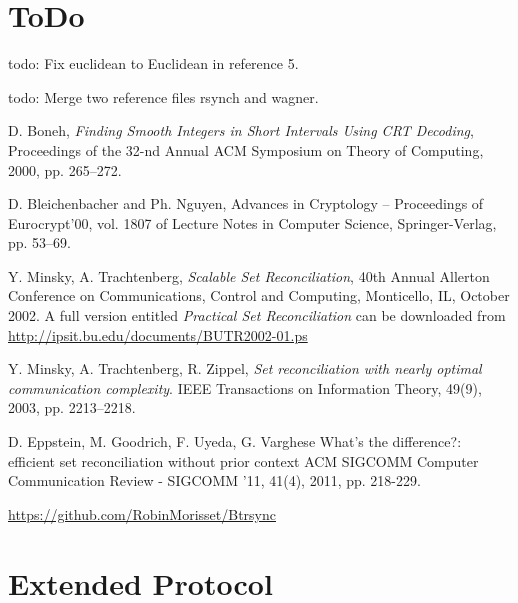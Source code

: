 \documentclass[11pt]{llncs}
\begin{document}
\section{ToDo}

todo: Fix euclidean to Euclidean in reference 5.\smallskip

todo: Merge two reference files rsynch and wagner.\smallskip

\nocite{rsync}
\nocite{wagner}




\begin{thebibliography}{30}

 D. Boneh, {\sl Finding Smooth Integers in Short Intervals Using CRT Decoding}, Proceedings of the 32-nd Annual ACM Symposium on Theory of Computing, 2000, pp. 265--272.

 D. Bleichenbacher and Ph. Nguyen, Advances in Cryptology -- Proceedings of Eurocrypt'00, vol. 1807 of Lecture Notes in Computer Science, Springer-Verlag, pp. 53--69.

 Y. Minsky, A. Trachtenberg, {\sl Scalable Set Reconciliation}, 40th Annual Allerton Conference on Communications, Control and Computing, Monticello, IL, October 2002. A full version entitled {\sl Practical Set Reconciliation} can be downloaded from \url{http://ipsit.bu.edu/documents/BUTR2002-01.ps}

 Y. Minsky, A. Trachtenberg, R. Zippel, {\sl Set reconciliation with nearly optimal communication complexity}. IEEE Transactions on Information Theory, 49(9), 2003, pp. 2213–2218.

 D. Eppstein, M. Goodrich, F. Uyeda, G. Varghese What's the difference?: efficient set reconciliation without prior context
ACM SIGCOMM Computer Communication Review - SIGCOMM '11, 41(4), 2011, pp. 218-229.

 \url{https://github.com/RobinMorisset/Btrsync}

\end{thebibliography}

\appendix

\section{Extended Protocol}
\end{document}
